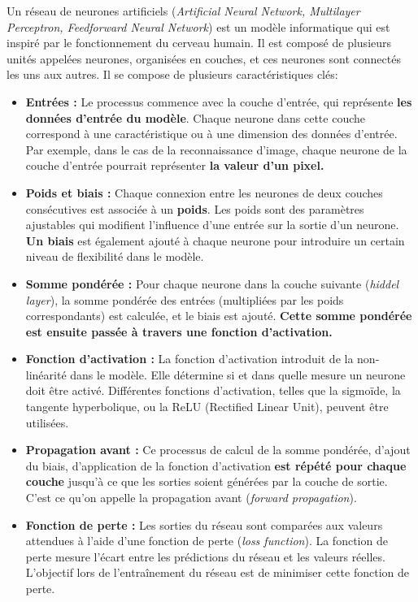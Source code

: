 \documentclass[a4paper]{article}
\begin{document}
Un réseau de neurones artificiels (\textit{Artificial Neural Network, Multilayer Perceptron, Feedforward Neural Network}) est un modèle informatique qui est inspiré par le fonctionnement du cerveau humain. Il est composé de plusieurs unités appelées neurones, organisées en couches, et ces neurones sont connectés les uns aux autres. Il se compose de plusieurs caractéristiques clés:
\begin{itemize}
    \item \textbf{Entrées :} Le processus commence avec la couche d'entrée, qui représente \textbf{les données d'entrée du modèle}. Chaque neurone dans cette couche correspond à une caractéristique ou à une dimension des données d'entrée. Par exemple, dans le cas de la reconnaissance d'image, chaque neurone de la couche d'entrée pourrait représenter \textbf{la valeur d'un pixel.}

    \item \textbf{Poids et biais :} Chaque connexion entre les neurones de deux couches consécutives est associée à un \textbf{poids}. Les poids sont des paramètres ajustables qui modifient l'influence d'une entrée sur la sortie d'un neurone. \textbf{Un biais} est également ajouté à chaque neurone pour introduire un certain niveau de flexibilité dans le modèle.

    \item \textbf{Somme pondérée :} Pour chaque neurone dans la couche suivante (\textit{hiddel layer}), la somme pondérée des entrées (multipliées par les poids correspondants) est calculée, et le biais est ajouté. \textbf{Cette somme pondérée est ensuite passée à travers une fonction d'activation.}

    \item \textbf{Fonction d'activation :} La fonction d'activation introduit de la non-linéarité dans le modèle. Elle détermine si et dans quelle mesure un neurone doit être activé. Différentes fonctions d'activation, telles que la sigmoïde, la tangente hyperbolique, ou la ReLU (Rectified Linear Unit), peuvent être utilisées.

    \item \textbf{Propagation avant :} Ce processus de calcul de la somme pondérée, d'ajout du biais, d'application de la fonction d'activation \textbf{est répété pour chaque couche} jusqu'à ce que les sorties soient générées par la couche de sortie. C'est ce qu'on appelle la propagation avant (\textit{forward propagation}).

    \item \textbf{Fonction de perte :} Les sorties du réseau sont comparées aux valeurs attendues à l'aide d'une fonction de perte (\textit{loss function}). La fonction de perte mesure l'écart entre les prédictions du réseau et les valeurs réelles. L'objectif lors de l'entraînement du réseau est de minimiser cette fonction de perte.


\end{itemize}
\end{document}
